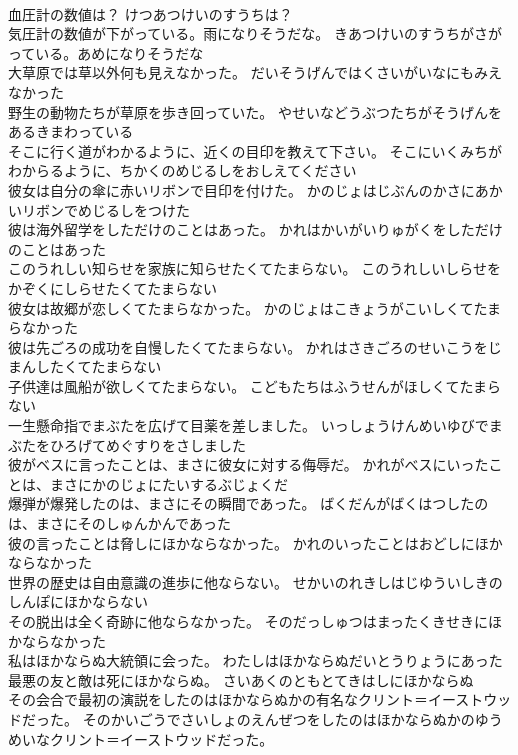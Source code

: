\documentclass[8pt]{extreport}
\begin{document}
\begin{CJK}{UTF8}{min}
\\	血圧計の数値は？	けつあつけいのすうちは？ 
\\	気圧計の数値が下がっている。雨になりそうだな。	きあつけいのすうちがさがっている。あめになりそうだな 
\\	大草原では草以外何も見えなかった。	だいそうげんではくさいがいなにもみえなかった 
\\	野生の動物たちが草原を歩き回っていた。	やせいなどうぶつたちがそうげんをあるきまわっている 
\\	そこに行く道がわかるように、近くの目印を教えて下さい。	そこにいくみちがわからるように、ちかくのめじるしをおしえてください 
\\	彼女は自分の傘に赤いリボンで目印を付けた。	かのじょはじぶんのかさにあかいリボンでめじるしをつけた 
\\	彼は海外留学をしただけのことはあった。	かれはかいがいりゅがくをしただけのことはあった 
\\	このうれしい知らせを家族に知らせたくてたまらない。	このうれしいしらせをかぞくにしらせたくてたまらない 
\\	彼女は故郷が恋しくてたまらなかった。	かのじょはこきょうがこいしくてたまらなかった 
\\	彼は先ごろの成功を自慢したくてたまらない。	かれはさきごろのせいこうをじまんしたくてたまらない 
\\	子供達は風船が欲しくてたまらない。	こどもたちはふうせんがほしくてたまらない 
\\	一生懸命指でまぶたを広げて目薬を差しました。	いっしょうけんめいゆびでまぶたをひろげてめぐすりをさしました 
\\	彼がベスに言ったことは、まさに彼女に対する侮辱だ。	かれがべスにいったことは、まさにかのじょにたいするぶじょくだ 
\\	爆弾が爆発したのは、まさにその瞬間であった。	ばくだんがばくはつしたのは、まさにそのしゅんかんであった 
\\	彼の言ったことは脅しにほかならなかった。	かれのいったことはおどしにほかならなかった 
\\	世界の歴史は自由意識の進歩に他ならない。	せかいのれきしはじゆういしきのしんぽにほかならない 
\\	その脱出は全く奇跡に他ならなかった。	そのだっしゅつはまったくきせきにほかならなかった 
\\	私はほかならぬ大統領に会った。	わたしはほかならぬだいとうりょうにあった 
\\	最悪の友と敵は死にほかならぬ。	さいあくのともとてきはしにほかならぬ 
\\	その会合で最初の演説をしたのはほかならぬかの有名なクリント＝イーストウッドだった。	そのかいごうでさいしょのえんぜつをしたのはほかならぬかのゆうめいなクリント＝イーストウッドだった。 

\end{CJK}
\end{document}
